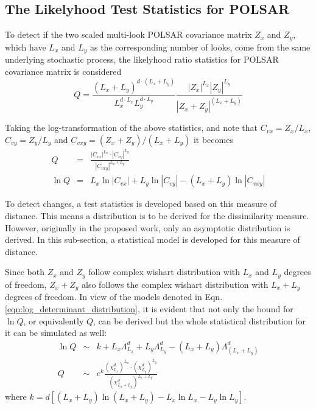 \documentclass[journal]{IEEEtran}
\begin{document}
\subsection{The Likelyhood Test Statistics for POLSAR}

To detect if the two scaled multi-look POLSAR covariance matrix $Z_x$ and $Z_y$,
  which have $L_x$ and $L_y$ as the corresponding number of looks,
  come from the same underlying stochastic process,
the likelyhood ratio statistics for POLSAR covariance matrix is considered \cite{Conradsen_2003_TGRS_4} 
\begin{equation}
  Q = \frac{(L_x+L_y)^{d \cdot (L_x+L_y)}}{L_x^{d \cdot L_x} L_y^{d \cdot L_y}} \frac{|Z_x|^{L_x} |Z_y|^{L_y} }{|Z_x+Z_y|^{(L_x+L_y)}}
\end{equation}

Taking the log-transformation of the above statistics, and note that $C_{vx} = Z_x / L_x$, $C_{vy} = Z_y / L_y$ and $C_{vxy} = (Z_x + Z_y)/(L_x + L_y)$ it becomes 
\begin{eqnarray}
  Q &=& \frac{|C_{vx}|^{L_x} \cdot |C_{vy}|^{L_y} }{|C_{vxy}|^{L_x + L_y}} \nonumber \\
  \ln Q &=& L_x \ln |C_{vx}| + L_y \ln |C_{vy}| - (L_x + L_y) \ln |C_{vxy}| \nonumber
\end{eqnarray}

To detect changes, a test statistics is developed based on this measure of distance.
This means a distribution is to be derived for the dissimilarity measure.
However, originally in the proposed work, only an asymptotic distribution is derived.
In this sub-section, a statistical model is developed for this measure of distance.

Since both $Z_x$ and $Z_y$ follow complex wishart distribution with $L_x$ and $L_y$ degrees of freedom,
  $Z_x+Z_y$ also follows the complex wishart distribution with $L_x + L_y$ degrees of freedom.
In view of the models denoted in Eqn. \ref{eqn:log_determinant_distribution},
  it is evident that not only the bound for $\ln Q$, or equivalently $Q$, can be derived
  but the whole statistical distribution for it can be simulated as well:
\begin{eqnarray}
  \ln{Q} &\sim&  k + L_x \Lambda^d_{L_x} + L_y \Lambda^d_{L_y} - (L_x + L_y) \Lambda^d_{(L_x + L_y)} \\
  Q &\sim& e^k \frac{(\chi^d_{L_x})^{L_x} \cdot (\chi^d_{L_y})^{L_y}}{(\chi^d_{L_x + L_y})^{L_x + L_y}}  
\end{eqnarray}
where $k = d \left[ (L_x + L_y) \ln(L_x + L_y) - L_x \ln{L_x} - L_y \ln{L_y} \right]$.
\end{document}
